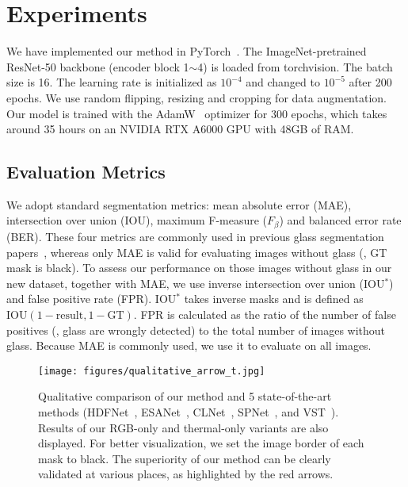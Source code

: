\section{Experiments}
\label{sec:exp}

We have implemented our method in PyTorch~\cite{paszke2019pytorch}. The ImageNet-pretrained ResNet-50 backbone (encoder block 1$\sim$4) is loaded from torchvision. The batch size is 16. The learning rate is initialized as $10^{-4}$ and changed to $10^{-5}$ after 200 epochs. We use random flipping, resizing and cropping for data augmentation. Our model is trained with the  AdamW~\cite{loshchilov2017decoupled} optimizer for 300 epochs, which takes around 35 hours on an NVIDIA RTX A6000 GPU with 48GB of RAM.


\subsection{Evaluation Metrics}

We adopt standard segmentation metrics: mean absolute error (MAE), intersection over union (IOU), maximum F-measure ($F_\beta$) and balanced error rate (BER). These four metrics are commonly used in previous glass segmentation papers~\cite{mei2020don,lin2021rich,He_2021_ICCV}, whereas only MAE is valid for evaluating images without glass (\ie, GT mask is black). To assess our performance on those images without glass in our new dataset, together with MAE, we use inverse intersection over union (IOU$^\ast$) and false positive rate (FPR). IOU$^\ast$ takes inverse masks and is defined as $\text{IOU}(1-\text{result}, 1-\text{GT})$. FPR is calculated as the ratio of the number of false positives (\ie, glass are wrongly detected) to the total number of images without glass. Because  MAE is commonly used, we use it to evaluate on all images.


\begin{figure*}
\centering
\texttt{[image: figures/qualitative\_arrow\_t.jpg]}
\caption{Qualitative comparison of our method and 5 state-of-the-art methods (HDFNet~\cite{pang2020hierarchical}, ESANet~\cite{seichter2021efficient}, CLNet~\cite{zhang2021rgb}, SPNet~\cite{zhou2021specificity}, and VST~\cite{liu2021visual}). Results of our RGB-only and thermal-only variants are also displayed. For better visualization, we set the image border of each mask to black. The superiority of our method can be clearly validated at various places, as highlighted by the red arrows.}
\label{fig:qualitative}
\end{figure*}

